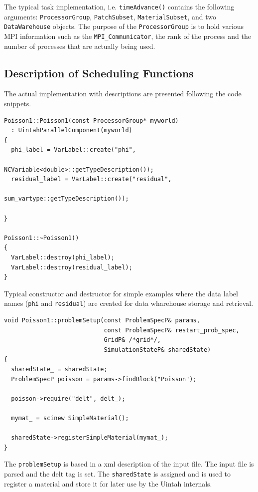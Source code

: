 \documentclass[12pt]{report}
\begin{document}
The typical task implementation, i.e. \texttt{timeAdvance()} contains
the following arguments: \texttt{ProcessorGroup},
\texttt{PatchSubset}, \texttt{MaterialSubset}, and two
\texttt{DataWarehouse} objects.  The purpose of the
\texttt{ProcessorGroup} is to hold various MPI information such as the
\texttt{MPI\_Communicator}, the rank of the process and the number of
processes that are actually being used.

\subsection{Description of Scheduling Functions}

The actual implementation with descriptions are presented following
the code snippets.

\begin{Verbatim}[fontsize=\footnotesize]
Poisson1::Poisson1(const ProcessorGroup* myworld)
  : UintahParallelComponent(myworld)
{
  phi_label = VarLabel::create("phi", 
                               NCVariable<double>::getTypeDescription());
  residual_label = VarLabel::create("residual", 
                                    sum_vartype::getTypeDescription());

}

Poisson1::~Poisson1()
{
  VarLabel::destroy(phi_label);
  VarLabel::destroy(residual_label);
}

\end{Verbatim}

Typical constructor and destructor for simple examples where the data
label names (\texttt{phi} and \texttt{residual}) are created for data
wharehouse storage and retrieval.

\begin{Verbatim}[fontsize=\footnotesize]
void Poisson1::problemSetup(const ProblemSpecP& params,
                            const ProblemSpecP& restart_prob_spec,
                            GridP& /*grid*/,
                            SimulationStateP& sharedState)
{
  sharedState_ = sharedState;
  ProblemSpecP poisson = params->findBlock("Poisson");

  poisson->require("delt", delt_);

  mymat_ = scinew SimpleMaterial();

  sharedState->registerSimpleMaterial(mymat_);
}
\end{Verbatim}

The \texttt{problemSetup} is based in a xml description of the input
file.  The input file is parsed and the delt tag is set.  The
\texttt{sharedState} is assigned and is used to register a material
and store it for later use by the Uintah internals.
\end{document}
